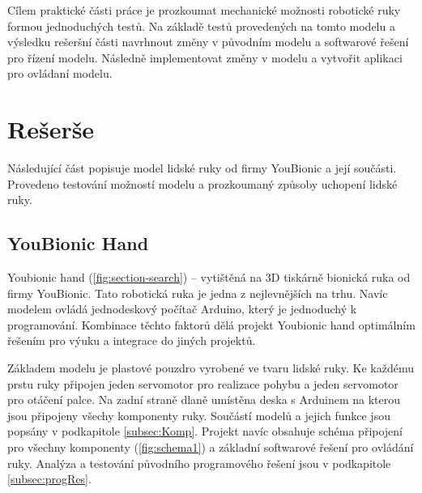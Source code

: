 \documentclass[thesis=B,czech]{FITthesis}[2012/06/26]
\begin{document}
Cílem praktické části práce je prozkoumat mechanické možnosti robotické ruky formou jednoduchých testů. Na základě testů provedených na tomto modelu a výsledku rešeršní části navrhnout změny v původním modelu a softwarové řešení pro řízení modelu. Následně implementovat změny v modelu a vytvořit aplikaci pro ovládaní modelu.



\chapter{Rešerše}

Následující část popisuje model lidské ruky od firmy YouBionic a její součásti. Provedeno testování možností modelu a prozkoumaný způsoby uchopení lidské ruky.


\section{YouBionic Hand}

Youbionic hand (\ref{fig:section-search}) – vytištěná na 3D tiskárně bionická ruka od firmy YouBionic. Tato robotická ruka je jedna z nejlevnějších na trhu. Navíc modelem ovládá jednodeskový počítač Arduino, který je jednoduchý k programování. Kombinace těchto faktorů dělá projekt Youbionic hand optimálním řešením pro výuku a integrace do jiných projektů.


Základem modelu je plastové pouzdro vyrobené ve tvaru lidské ruky. Ke každému prstu ruky připojen jeden servomotor pro realizace pohybu a jeden servomotor pro otáčení palce. Na zadní straně dlaně umístěna deska s Arduinem na kterou jsou připojeny všechy komponenty ruky. Součástí modelů a jejich funkce jsou popsány v podkapitole \ref{subsec:Komp}. Projekt navíc obsahuje schéma připojení pro všechny komponenty (\ref{fig:schema1}) a základní softwarové řešení pro ovládání ruky. Analýza a testování původního programového řešení jsou v podkapitole \ref{subsec:progRes}.

\newpage
\end{document}
